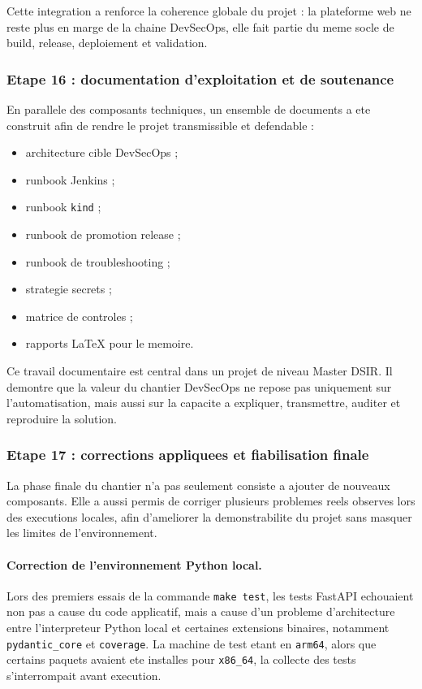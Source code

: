 Cette integration a renforce la coherence globale du projet : la plateforme web ne reste plus en marge de la chaine DevSecOps, elle fait partie du meme socle de build, release, deploiement et validation.

\subsubsection{Etape 16 : documentation d'exploitation et de soutenance}

En parallele des composants techniques, un ensemble de documents a ete construit afin de rendre le projet transmissible et defendable :

\begin{itemize}
  \item architecture cible DevSecOps ;
  \item runbook Jenkins ;
  \item runbook \texttt{kind} ;
  \item runbook de promotion release ;
  \item runbook de troubleshooting ;
  \item strategie secrets ;
  \item matrice de controles ;
  \item rapports LaTeX pour le memoire.
\end{itemize}

Ce travail documentaire est central dans un projet de niveau Master DSIR. Il demontre que la valeur du chantier DevSecOps ne repose pas uniquement sur l'automatisation, mais aussi sur la capacite a expliquer, transmettre, auditer et reproduire la solution.

\subsubsection{Etape 17 : corrections appliquees et fiabilisation finale}

La phase finale du chantier n'a pas seulement consiste a ajouter de nouveaux composants. Elle a aussi permis de corriger plusieurs problemes reels observes lors des executions locales, afin d'ameliorer la demonstrabilite du projet sans masquer les limites de l'environnement.

\paragraph{Correction de l'environnement Python local.}
Lors des premiers essais de la commande \texttt{make test}, les tests FastAPI echouaient non pas a cause du code applicatif, mais a cause d'un probleme d'architecture entre l'interpreteur Python local et certaines extensions binaires, notamment \texttt{pydantic\_core} et \texttt{coverage}. La machine de test etant en \texttt{arm64}, alors que certains paquets avaient ete installes pour \texttt{x86\_64}, la collecte des tests s'interrompait avant execution.

